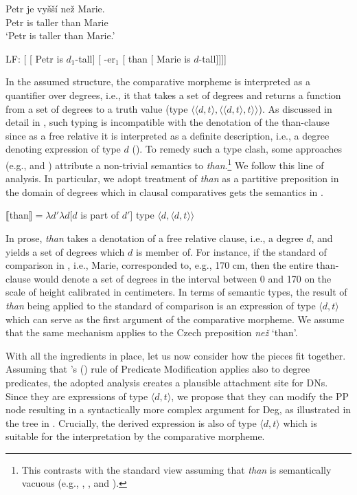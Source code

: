 \documentclass[output=paper,modfonts,hidelinks,newtxmath
\ChapterDOI{10.5281/zenodo.2545513}
]{langscibook}
\begin{document}
\ea \ea \gll Petr je vyšší než Marie.\label{comp}\\
Petr is taller than Marie\\
\glt `Petr is taller than Marie.'

\newpage
\ex LF: [ [ Petr is $d_1$-tall] [ -er$_1$ [ than [ Marie is $d$-tall]]]]\label{comp-LF}
\z \z

\noindent In the assumed structure, the comparative morpheme is interpreted as a quantifier over degrees, i.e., it that takes a set of degrees and returns a function from a set of degrees to a truth value (type $\langle \langle d,t\rangle,\langle \langle d,t\rangle,t\rangle\rangle$). As discussed in detail in \cite{pancheva2006phrasal}, such typing is incompatible with the denotation of the than-clause since as a free relative it is interpreted as a definite description, i.e., a degree denoting expression of type $d$ (\citealt{heim_degree_2000}). To remedy such a type clash, some approaches (e.g., \citealt{von_stechow_comparing_1984} and \citealt{rullmann1995maximality}) attribute a non-trivial semantics to \textit{than}.\footnote{This contrasts with the standard view assuming that \textit{than} is semantically vacuous (e.g., \citealt{heim_degree_2000}, \citealt{kennedy2001polar}, and \citealt{schwarzschild_wilkinson2002quantifiers}).} We follow this line of analysis. In particular, we adopt  treatment of \textit{than} as a partitive preposition in the domain of degrees which in clausal comparatives gets the semantics in .

\ea $\llbracket$than$\rrbracket = \lambda d'\lambda d[d$ is part of $d']$ \hfill{type $\langle d,\langle d,t\rangle\rangle$}\label{than-semantics}
\z

\noindent In prose, \textit{than} takes a denotation of a free relative clause, i.e., a degree $d$, and yields a set of degrees which $d$ is member of. For instance, if the standard of comparison in , i.e., Marie, corresponded to, e.g., 170 cm, then the entire than-clause would denote a set of degrees in the interval between 0 and 170 on the scale of height calibrated in centimeters. In terms of semantic types, the result of \textit{than} being applied to the standard of comparison is an expression of type $\langle d,t\rangle$ which can serve as the first argument of the comparative morpheme. We assume that the same mechanism applies to the Czech preposition \textit{než} `than'.

With all the ingredients in place, let us now consider how the pieces fit together. Assuming that \citeauthor{heim_kratzer1998semantics}'s (\citeyear{heim_kratzer1998semantics}) rule of Predicate Modification applies also to degree predicates, the adopted analysis creates a plausible attachment site for DNs. Since they are expressions of type $\langle d,t\rangle$, we propose that they can modify the PP node resulting in a syntactically more complex argument for Deg, as illustrated in the tree in . Crucially, the derived expression is also of type $\langle d,t\rangle$ which is suitable for the interpretation by the comparative morpheme.
\end{document}
